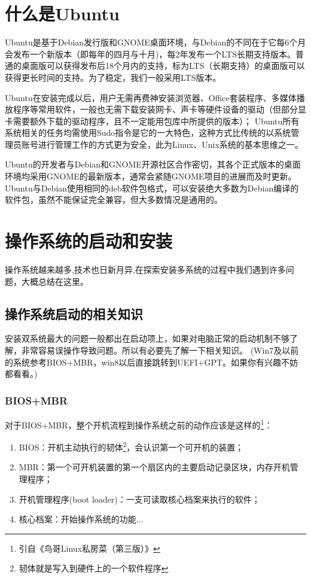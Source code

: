 \section{什么是Ubuntu}

Ubuntu是基于Debian发行版和GNOME桌面环境，与Debian的不同在于它每6个月会发布一个新版本（即每年的四月与十月)，每2年发布一个LTS长期支持版本。普通的桌面版可以获得发布后18个月内的支持，标为LTS（长期支持）的桌面版可以获得更长时间的支持。为了稳定，我们一般采用LTS版本。

Ubuntu在安装完成以后，用户无需再费神安装浏览器、Office套装程序、多媒体播放程序等常用软件，一般也无需下载安装网卡、声卡等硬件设备的驱动（但部分显卡需要额外下载的驱动程序，且不一定能用包库中所提供的版本）；
Ubuntu所有系统相关的任务均需使用Sudo指令是它的一大特色，这种方式比传统的以系统管理员账号进行管理工作的方式更为安全，此为Linux、Unix系统的基本思维之一。

Ubuntu的开发者与Debian和GNOME开源社区合作密切，其各个正式版本的桌面环境均采用GNOME的最新版本，通常会紧随GNOME项目的进展而及时更新。Ubuntu与Debian使用相同的deb软件包格式，可以安装绝大多数为Debian编译的软件包，虽然不能保证完全兼容，但大多数情况是通用的。

\section{操作系统的启动和安装}
操作系统越来越多,技术也日新月异,在探索安装多系统的过程中我们遇到许多问题，大概总结在这里。

\subsection{操作系统启动的相关知识}
安装双系统最大的问题一般都出在启动项上，如果对电脑正常的启动机制不够了解，非常容易误操作导致问题。所以有必要先了解一下相关知识。
(Win7及以前的系统参考BIOS+MBR，win8以后直接跳转到UEFI+GPT。如果你有兴趣不妨都看看。)
\subsubsection{BIOS+MBR}
对于BIOS+MBR，整个开机流程到操作系统之前的动作应该是这样的\footnote{引自《鸟哥Linux私房菜（第三版）》}：
\begin{enumerate}
	\item BIOS：开机主动执行的韧体\footnote{韧体就是写入到硬件上的一个软件程序}，会认识第一个可开机的装置；
	\item MBR：第一个可开机装置的第一个扇区内的主要启动记录区块，内存开机管理程序；
	\item 开机管理程序(boot loader)：一支可读取核心档案来执行的软件；
	\item 核心档案：开始操作系统的功能...
\end{enumerate}

